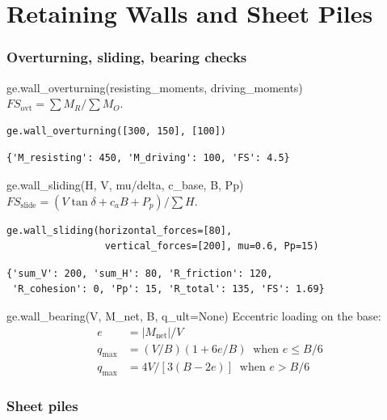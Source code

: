 \documentclass[11pt,a4paper,openany]{book}
\begin{document}
\chapter{Retaining Walls and Sheet Piles}\label{ch:walls}

\subsection{Overturning, sliding, bearing checks}

\begin{funcbox}{ge.wall\_overturning(resisting\_moments, driving\_moments)}
$FS_{\text{ovt}} = \sum M_R / \sum M_O$.
\end{funcbox}

\begin{lstlisting}
ge.wall_overturning([300, 150], [100])
\end{lstlisting}
\begin{lstlisting}[style=output]
{'M_resisting': 450, 'M_driving': 100, 'FS': 4.5}
\end{lstlisting}

\begin{funcbox}{ge.wall\_sliding(H, V, mu/delta, c\_base, B, Pp)}
$FS_{\text{slide}} = (V\tan\delta + c_a B + P_p)/\sum H$.
\end{funcbox}

\begin{lstlisting}
ge.wall_sliding(horizontal_forces=[80],
                 vertical_forces=[200], mu=0.6, Pp=15)
\end{lstlisting}
\begin{lstlisting}[style=output]
{'sum_V': 200, 'sum_H': 80, 'R_friction': 120,
 'R_cohesion': 0, 'Pp': 15, 'R_total': 135, 'FS': 1.69}
\end{lstlisting}

\begin{funcbox}{ge.wall\_bearing(V, M\_net, B, q\_ult=None)}
Eccentric loading on the base:
\begin{align*}
e         &= |M_{\text{net}}|/V \\
q_{\max}  &= (V/B)(1 + 6e/B)\;\;\text{when } e \leq B/6 \\
q_{\max}  &= 4V/[3(B - 2e)]\;\;\text{when } e > B/6
\end{align*}
\end{funcbox}

\subsection{Sheet piles}
\end{document}
